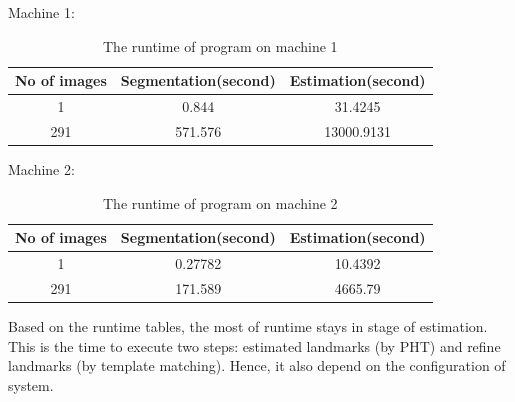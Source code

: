 Machine 1:
\begin{table}[h]
	\centering
	\begin{tabular}{|c|c|c|}
		\hline
		No of images & Segmentation(second) & Estimation(second) \\ \hline
		1 & 0.844 & 31.4245   \\ \hline
		291 & 571.576 & 13000.9131   \\ \hline
	\end{tabular}	
	\caption{The runtime of program on machine 1}		
	\label{table_runtime1}
\end{table}

Machine 2:
\begin{table}[h]
	\centering
	\begin{tabular}{|c|c|c|}
		\hline
		No of images & Segmentation(second) & Estimation(second) \\ \hline
		1 & 0.27782 & 10.4392   \\ \hline
		291 & 171.589 & 4665.79   \\ \hline
	\end{tabular}
	\caption{The runtime of program on machine 2}
	\label{table_runtime2}
\end{table}
Based on the runtime tables, the most of runtime stays in stage of estimation. This is the time to execute two steps: estimated landmarks (by PHT) and refine landmarks (by template matching). Hence, it also depend on the configuration of system.
